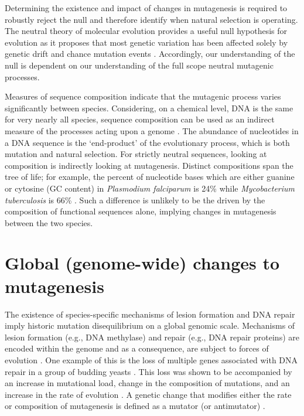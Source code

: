 Determining the existence and impact of changes in mutagenesis is required to robustly reject the null and therefore identify when natural selection is operating. The neutral theory of molecular evolution provides a useful null hypothesis for evolution as it proposes that most genetic variation has been affected solely by genetic drift and chance mutation events \citep{Kimura1968EvolutionaryLevel, King1969Non-DarwinianEvolution}. Accordingly, our understanding of the null is dependent on our understanding of the full scope neutral mutagenic processes. 

Measures of sequence composition indicate that the mutagenic process varies significantly between species. Considering, on a chemical level, DNA is the same for very nearly all species, sequence composition can be used as an indirect measure of the processes acting upon a genome \citep{Karlin1994ComparisonsSequences, Karlin1995DinucleotideSignature}. The abundance of nucleotides in a DNA sequence is the `end-product' of the evolutionary process, which is both mutation and natural selection. For strictly neutral sequences, looking at composition is indirectly looking at mutagenesis. Distinct compositions span the tree of life; for example, the percent of nucleotide bases which are either guanine or cytosine (GC content) in \textit{Plasmodium falciparum} is 24\% while \textit{Mycobacterium tuberculosis} is  66\% \citep{Nakamura2000Codon2000}. Such a difference is unlikely to be the driven by the composition of functional sequences alone, implying changes in mutagenesis between the two species. 

\section{Global (genome-wide) changes to mutagenesis}

The existence of species-specific mechanisms of lesion formation \citep{Moore2012DNAFunction} and DNA repair \citep{Kelner1949EffectInjury} imply historic mutation disequilibrium on a global genomic scale. Mechanisms of lesion formation (e.g., DNA methylase) and repair (e.g., DNA repair proteins) are encoded within the genome and as a consequence, are subject to forces of evolution \citep{Lynch2010EvolutionRate, Lynch2016GeneticRate}. One example of this is the loss of multiple genes associated with DNA repair in a group of budding yeasts \citep{Steenwyk2019ExtensiveYeasts}. This loss was shown to be accompanied by an increase in mutational load, change in the composition of mutations, and an increase in the rate of evolution \citep{Steenwyk2019ExtensiveYeasts}. A genetic change that modifies either the rate or composition of mutagenesis is defined as a mutator (or antimutator) \citep{Lynch2016GeneticRate}. 

